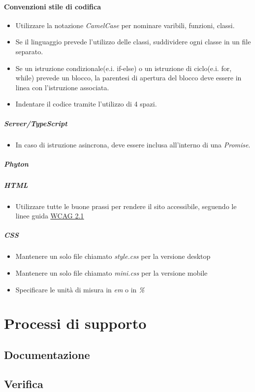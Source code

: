 \documentclass[a4paper, 12pt]{article}
\begin{document}
\paragraph{Convenzioni stile di codifica}
\begin{itemize}
	\item Utilizzare la notazione \textit{CamelCase} per nominare varibili, funzioni, classi.
	\item Se il linguaggio prevede l'utilizzo delle classi, suddividere ogni classe in un file separato.
	\item Se un istruzione condizionale(e.i. if-else) o un istruzione di ciclo(e.i. for, while) prevede un blocco,
	la parentesi di apertura del blocco deve essere in linea con l'istruzione associata.
	\item Indentare il codice tramite l'utilizzo di 4 spazi.
\end{itemize}
\subparagraph{Server/TypeScript}
\begin{itemize}
	\item In caso di istruzione asincrona, deve essere inclusa all'interno di una \textit{Promise}.
\end{itemize}
\subparagraph{Phyton}
\subparagraph{HTML}
\begin{itemize}
	\item Utilizzare tutte le buone prassi per rendere il sito accessibile, seguendo le linee guida 
	\href{https://www.w3.org/Translations/WCAG21-it/}{\underline{WCAG 2.1}}
\end{itemize}
\subparagraph{CSS}
	\begin{itemize}
		\item Mantenere un solo file chiamato \textit{style.css} per la versione desktop 
		\item Mantenere un solo file chiamato \textit{mini.css} per la versione mobile
		\item Specificare le unità di misura in \textit{em} o in \textit{\%}
	\end{itemize}




\section{Processi di supporto}
\subsection{Documentazione}
\subsection{Verifica}
\end{document}
